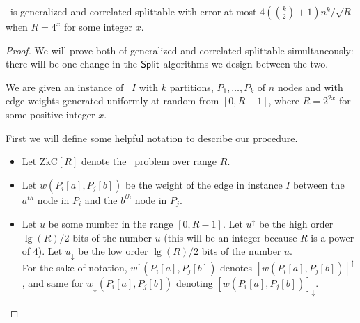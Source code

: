 \newcommand{\high}[1]{{#1}^\uparrow}
\newcommand{\low}[1]{{#1}_\downarrow}
\newcommand{\ZkC}{\mathrm{Z}$k$\mathrm{C}}

\begin{lemma}\label{lem:zkcSplitConvenientRange}
	\zkclique~is generalized and correlated splittable with error at most $4(\binom{k}{2} + 1) n^k/\sqrt{R}$ when $R=4^{x}$ for some integer $x$. 
\end{lemma}
\begin{proof}
	We will prove both of generalized and correlated splittable simultaneously: there will be one change in the $\mathsf{Split}$ algorithms we design between the two.
	
	We are given an instance of \zkclique~$I$ with $k$ partitions, $P_1, \ldots, P_k$ of $n$ nodes and with edge weights generated uniformly at random from $[0,R-1]$, where $R = 2^{2x}$ for some positive integer $x$.

	First we will define some helpful notation to describe our procedure.
	\begin{itemize}
		\item Let $\ZkC[R]$ denote the \zkclique~problem over range $R$.
		\item Let $w(P_i[a],P_j[b])$ be the weight of the edge in instance $I$ between the $a^{th}$ node in  $P_i$ and the $b^{th}$ node in $P_j$.
		\item Let $u$ be some number in the range $[0,R-1]$. Let $\high{u}$ be the high order $\lg(R)/2$ bits of the number $u$ (this will be an integer because $R$ is a power of 4). Let $\low {u}$ be the low order $\lg(R)/2$ bits of the number $u$.\\
		For the sake of notation, $\high w (P_i[a], P_j[b])$ denotes $\high{[w (P_i[a], P_j[b])]}$, and same for $\low w (P_i[a], P_j[b])$ denoting $\low {[w (P_i[a], P_j[b])]}$.
	\end{itemize}


\end{proof}
